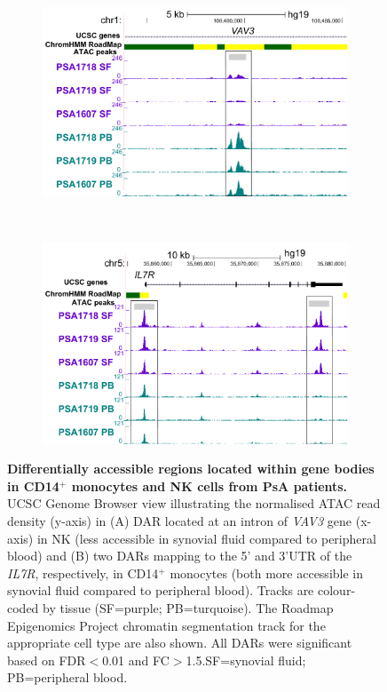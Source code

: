 \bigskip
\begin{figure}[H]
\centering
\begin{subfigure}[b]{0.60\textwidth}
\centering 
\includegraphics[width=\textwidth]{./Results3/pdfs/ATAC_PSA_NK_VAV3}
\caption{}
\end{subfigure}
~
\begin{subfigure}[b]{0.60\textwidth} 
\centering
\includegraphics[width=\textwidth]{./Results3/pdfs/ATAC_PSA_CD14_IL7R}
\caption{}
\end{subfigure}
\caption[Differentially accessible regions located within gene bodies in CD14$^+$ monocytes and NK cells from PsA patients.]{\textbf{Differentially accessible regions located within gene bodies in CD14$^+$ monocytes and NK cells from PsA patients.} UCSC Genome Browser view illustrating the normalised ATAC read density (y-axis) in (A) DAR located at an intron of \textit{VAV3} gene (x-axis) in NK (less accessible in synovial fluid compared to peripheral blood) and (B) two DARs mapping to the 5' and 3'UTR of the \textit{IL7R}, respectively, in CD14$^+$ monocytes (both more accessible in synovial fluid compared to peripheral blood). Tracks are colour-coded by tissue (SF=purple; PB=turquoise). The Roadmap Epigenomics Project chromatin segmentation track for the appropriate cell type are also shown. All DARs were significant based on FDR$<$0.01 and FC$>$1.5.SF=synovial fluid; PB=peripheral blood.}
\label{figure:PsA_FAST_ATAC_gene_boy_DOCS_CD14_NK}
\end{figure}




